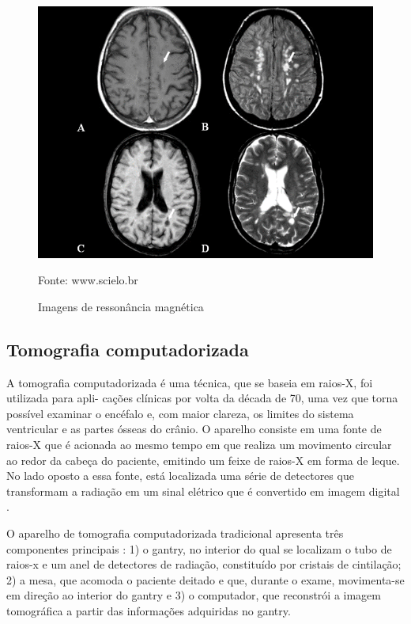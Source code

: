 \documentclass[openright]{UFRGS} %
\begin{document}
\begin{figure}[h]
    \centering
    \caption{Imagens de ressonância magnética}
    \includegraphics[scale=0.35]{figuras/image006.png}
    \centerline{Fonte: www.scielo.br}
    \label{fig:ressonacia}
\end{figure}

\subsection{Tomografia computadorizada}

A tomografia computadorizada é uma técnica, que se baseia em raios-X, foi utilizada para apli-
cações clínicas por volta da década de 70, uma vez que
torna possível examinar o encéfalo e, com maior clareza, os
limites do sistema ventricular e as partes ósseas do crânio. O
aparelho consiste em uma fonte de raios-X que é acionada ao
mesmo tempo em que realiza um movimento circular ao redor
da cabeça do paciente, emitindo um feixe de raios-X em forma
de leque. No lado oposto a essa fonte, está localizada uma série de detectores que transformam a radiação em um sinal elétrico que é convertido em imagem digital \cite{garib2007tomografia}.

O aparelho de tomografia computadorizada tradicional apresenta três componentes principais : 1) o gantry, no interior do qual se localizam o tubo de raios-x e um anel de detectores de radiação, constituído por cristais de cintilação; 2) a mesa, que acomoda o paciente deitado e que, durante o exame, movimenta-se em direção ao interior do gantry e 3) o computador, que reconstrói a imagem tomográfica a partir das informações adquiridas no gantry.
\end{document}
